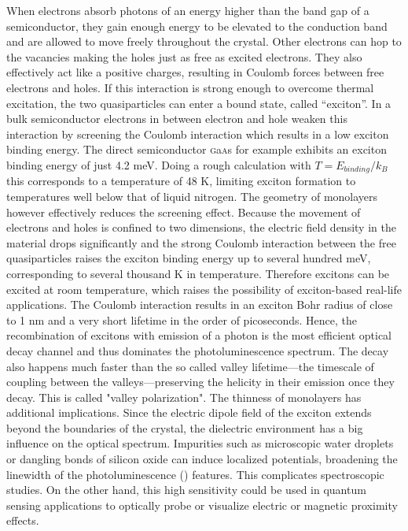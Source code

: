 When electrons absorb photons of an energy higher than the band gap of a semiconductor, they gain enough energy to be elevated to the conduction band and are allowed to move freely throughout the crystal. Other electrons can hop to the vacancies making the holes just as free as excited electrons. They also effectively act like a positive charges, resulting in Coulomb forces between free electrons and holes. If this interaction is strong enough to overcome thermal excitation, the two quasiparticles can enter a bound state, called ``exciton''. In a bulk semiconductor electrons in between electron and hole weaken this interaction by screening the Coulomb interaction which results in a low exciton binding energy. The direct semiconductor \textsc{g}a\textsc{a}s for example exhibits an exciton binding energy of just 4.2 meV\cite{pelant_luminescence_2012}. Doing a rough calculation with $T=E_{binding}/k_B$ this corresponds to a temperature of 48 K, limiting exciton formation to temperatures well below that of liquid nitrogen.
The geometry of \tmdg monolayers however effectively reduces the screening effect. Because the movement of electrons and holes is confined to two dimensions, the electric field density in the material drops significantly and the strong Coulomb interaction between the free quasiparticles raises the exciton binding energy up to several hundred meV\cite{chernikov_exciton_2014, hanbicki_measurement_2015, he_tightly_2014}, corresponding to several thousand K in temperature. Therefore excitons can be excited at room temperature, which raises the possibility of exciton-based real-life applications. The Coulomb interaction results in an exciton Bohr radius of close to 1 nm and a very short lifetime in the order of picoseconds\cite{palummo_exciton_2015}. Hence, the recombination of excitons with emission of a photon is the most efficient optical decay channel and thus dominates the photoluminescence spectrum.
The decay also happens much faster than the so called valley lifetime---the timescale of coupling between the valleys---preserving the helicity in their emission once they decay. This is called "valley polarization".
The thinness of \tmdg monolayers has additional implications. Since the electric dipole field of the exciton extends beyond the boundaries of the crystal, the dielectric environment has a big influence on the optical spectrum\cite{stier_probing_2016, borghardt_engineering_2017, jakubczyk_impact_2018}. Impurities such as microscopic water droplets or dangling bonds of silicon oxide can induce localized potentials, broadening the linewidth of the photoluminescence (\pl\!) features. This complicates spectroscopic studies. On the other hand, this high sensitivity could be used in quantum sensing applications to optically probe or visualize electric or magnetic proximity effects\cite{peng_valley_2017, zhao_enhanced_2017, smolenski_tuning_2016, neumann_opto-valleytronic_2017}.



